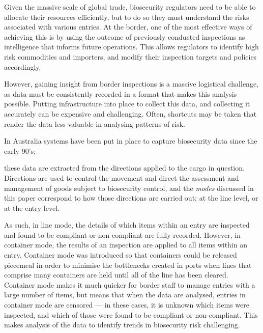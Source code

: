 \documentclass{article}
\newif\ifproofread
\newcommand{\rev}[1]{%
\ifproofread
\hl{#1}%
\else
#1%
\fi
}
\begin{document}
Given the massive scale of global trade, biosecurity regulators need to be able to allocate their resources efficiently, but to do so they must understand the risks associated with various entries. At the border, one of the most effective ways of achieving this is by using the outcome of previously conducted inspections as intelligence that informs future operations. This allows regulators to identify high risk commodities and importers, and modify their inspection targets and policies accordingly.

However, gaining insight from border inspections is a massive logistical challenge, as data must be consistently recorded in a format that makes this analysis possible. Putting infrastructure into place to collect this data, and collecting it accurately can be expensive and challenging. Often, shortcuts may be taken that render the data less valuable in analysing patterns of risk.

In Australia systems have been put in place to capture biosecurity data since the early 90's; \rev{these data are extracted from the directions applied to the cargo in question. Directions are used to control the movement and direct the assessment and management of goods subject to biosecurity control, and the \emph{modes} discussed in this paper correspond to how those directions are carried out: at the line level, or at the entry level.}  As such, in line mode, the details of which items within an entry are inspected and found to be compliant or non-compliant are fully recorded. However, in container mode, the results of an inspection are applied to all items within an entry. Container mode was introduced so that containers could be released piecemeal in order to minimise the bottlenecks created in ports when lines that comprise many containers are held until all of the line has been cleared. Container mode makes it much quicker for border staff to manage entries with a large number of items, but means that when the data are analysed, entries in container mode are censored --- in these cases, it is unknown which items were inspected, and which of those were found to be compliant or non-compliant. This makes analysis of the data to identify trends in biosecurity risk challenging. 
\end{document}
